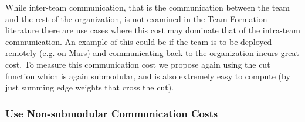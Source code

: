 While inter-team communication, that is the communication between the team and the rest of the organization, is not examined in the Team Formation literature there are use cases where this cost may dominate that of the intra-team communication. An example of this could be if the team is to be deployed remotely (e.g. on Mars) and communicating back to the organization incurs great cost. To measure this communication cost we propose again using the cut function which is again submodular, and is also extremely easy to compute (by just summing edge weights that cross the cut).

\subsubsection{Use Non-submodular Communication Costs}

  